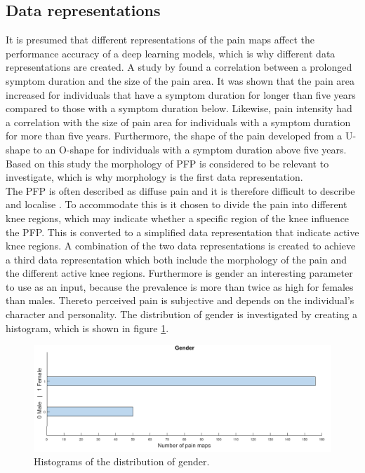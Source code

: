 \subsection{Data representations} \label{sec:representation}
It is presumed that different representations of the pain maps affect the performance accuracy of a deep learning models, which is why different data representations are created.
A study by \citeauthor{Boudreau2017} found a correlation between a prolonged symptom duration and the size of the pain area. It was shown that the pain area increased for individuals that have a symptom duration for longer than five years compared to those with a symptom duration below. Likewise, pain intensity had a correlation with the size of pain area for individuals with a symptom duration for more than five years. Furthermore, the shape of the pain developed from a U-shape to an O-shape for individuals with a symptom duration above five years.\citep{Boudreau2017} \\
Based on this study the morphology of PFP is considered to be relevant to investigate, which is why morphology is the first data representation.\\

\noindent
The PFP is often described as diffuse pain and it is therefore difficult to describe and localise \citep{Witvrouw2014}. To accommodate this is it chosen to divide the pain into different knee regions, which may indicate whether a specific region of the knee influence the PFP. This is converted to a simplified data representation that indicate active knee regions.
A combination of the two data representations is created to achieve a third data representation which both include the morphology of the pain and the different active knee regions.
\noindent
Furthermore is gender an interesting parameter to use as an input, because the prevalence is more than twice as high for females than males. Thereto perceived pain is subjective and depends on the individual's character and personality. The distribution of gender is investigated by creating a histogram, which is shown in figure \ref{fig:histogender}.

\begin{figure} [H]
\centering
\includegraphics[width=1\textwidth]{figures/histoGender}
\caption{Histograms of the distribution of gender.}
\label{fig:histogender}
\end{figure}

